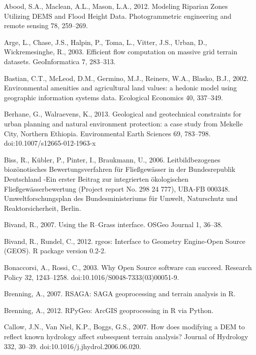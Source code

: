 \begin{thebibliography}

\bibitem{} \hangindent=1cm Abood, S.A., Maclean, A.L., Mason, L.A., 2012. Modeling Riparian Zones Utilizing DEMS and Flood Height Data. Photogrammetric engineering and remote sensing 78, 259–269.

\bibitem{} \hangindent=1cm Arge, L., Chase, J.S., Halpin, P., Toma, L., Vitter, J.S., Urban, D., Wickremesinghe, R., 2003. Efficient flow computation on massive grid terrain datasets. GeoInformatica 7, 283–313.

\bibitem{} \hangindent=1cm Bastian, C.T., McLeod, D.M., Germino, M.J., Reiners, W.A., Blasko, B.J., 2002. Environmental amenities and agricultural land values: a hedonic model using geographic information systems data. Ecological Economics 40, 337–349.

\bibitem{} \hangindent=1cm Berhane, G., Walraevens, K., 2013. Geological and geotechnical constraints for urban planning and natural environment protection: a case study from Mekelle City, Northern Ethiopia. Environmental Earth Sciences 69, 783–798. doi:10.1007/s12665-012-1963-x

\bibitem{} \hangindent=1cm Biss, R., Kübler, P., Pinter, I., Braukmann, U., 2006. Leitbildbezogenes biozönotisches Bewertungsverfahren für Fließgewässer in der Bundesrepublik Deutschland -Ein erster Beitrag zur integrierten ökologischen Fließgewässerbewertung (Project report No. 298 24 777), UBA-FB 000348. Umweltforschungsplan des Bundesministeriums für Umwelt, Naturschutz und Reaktorsicherheit, Berlin.

\bibitem{} \hangindent=1cm Bivand, R., 2007. Using the R–Grass interface. OSGeo Journal 1, 36–38.

\bibitem{} \hangindent=1cm Bivand, R., Rundel, C., 2012. rgeos: Interface to Geometry Engine-Open Source (GEOS). R package version 0.2-2.

\bibitem{} \hangindent=1cm Bonaccorsi, A., Rossi, C., 2003. Why Open Source software can succeed. Research Policy 32, 1243–1258. doi:10.1016/S0048-7333(03)00051-9.

\bibitem{} \hangindent=1cm Brenning, A., 2007. RSAGA: SAGA geoprocessing and terrain analysis in R.

\bibitem{} \hangindent=1cm Brenning, A., 2012. RPyGeo: ArcGIS geoprocessing in R via Python.

\bibitem{} \hangindent=1cm Callow, J.N., Van Niel, K.P., Boggs, G.S., 2007. How does modifying a DEM to reflect known hydrology affect subsequent terrain analysis? Journal of Hydrology 332, 30–39. doi:10.1016/j.jhydrol.2006.06.020.


\end{thebibliography}
